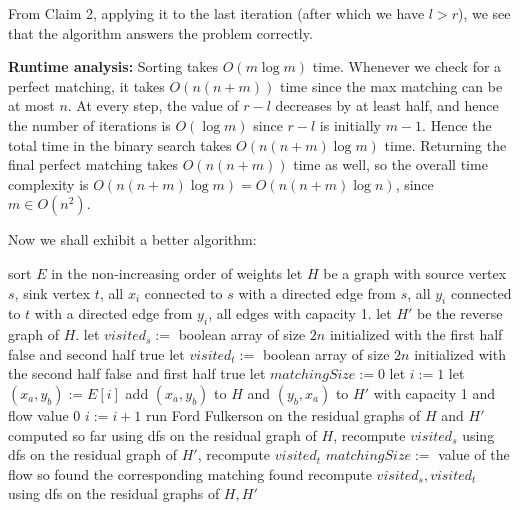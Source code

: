 \documentclass[answers]{exam}
\begin{document}
\begin{questions}
\begin{solution}
    From Claim 2, applying it to the last iteration (after which we have $l > r$), we see that the algorithm answers the problem correctly.

    \textbf{Runtime analysis:}
    Sorting takes $O(m \log m)$ time. Whenever we check for a perfect matching, it takes $O(n(n + m))$ time since the max matching can be at most $n$. At every step, the value of $r - l$ decreases by at least half, and hence the
    number of iterations is $O(\log m)$ since $r - l$ is initially $m - 1$. Hence the total time in the binary search takes $O(n(n + m) \log m)$ time. Returning the final perfect matching takes
    $O(n(n + m))$ time
    as well, so the overall time complexity is $O(n(n + m) \log m) = O(n(n + m) \log n)$, since $m \in O(n^2)$.
\end{solution}

\begin{solution}

    Now we shall exhibit a better algorithm:

    \begin{algorithmic}
            \State sort $E$ in the non-increasing order of weights
            \State let $H$ be a graph with source vertex $s$, sink vertex $t$, all $x_i$ connected to $s$ with a directed edge from $s$, all $y_i$ connected to $t$ with a directed edge from $y_i$,
            all edges with capacity 1.
            \State let $H'$ be the reverse graph of $H$.
            \State let $visited_s := $ boolean array of size $2n$ initialized with the first half false and second half true
            \State let $visited_t := $ boolean array of size $2n$ initialized with the second half false and first half true
            \State let $matchingSize := 0$
            \State let $i := 1$
                \State let $(x_a, y_b) := E[i]$
                \State add $(x_a, y_b)$ to $H$ and $(y_b, x_a)$ to $H'$ with capacity 1 and flow value 0
                \State $i := i + 1$
                    \State run Ford Fulkerson on the residual graphs of $H$ and $H'$ computed so far
                    \State using dfs on the residual graph of $H$, recompute $visited_s$
                    \State using dfs on the residual graph of $H'$, recompute $visited_t$
                    \State $matchingSize := $ value of the flow so found
                        \State \Return the corresponding matching found
                    \EndIf
                    \State recompute $visited_s, visited_t$ using dfs on the residual graphs of $H, H'$
                \EndIf
            \EndWhile
        \EndFunction
    \end{algorithmic}


\end{solution}
\end{questions}
\end{document}
